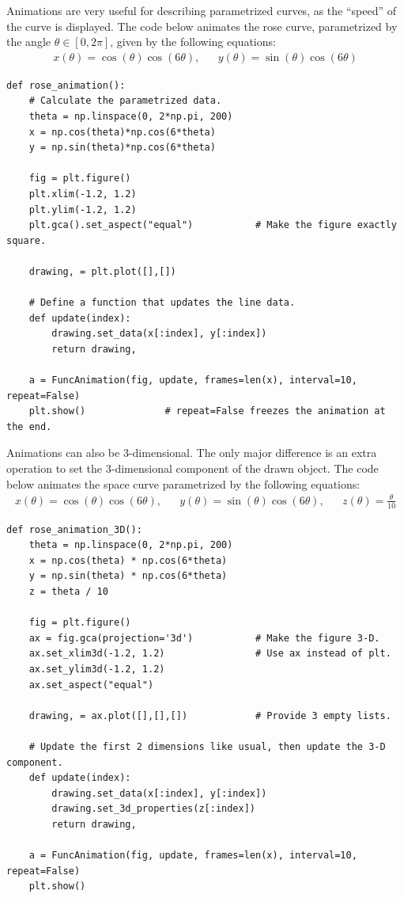 Animations are very useful for describing parametrized curves, as the ``speed'' of the curve is displayed.
The code below animates the rose curve, parametrized by the angle $\theta \in [0, 2\pi]$, given by the following equations:
%
\[\begin{array}{ccc}
x(\theta) = \cos(\theta)\cos(6\theta), && y(\theta) = \sin(\theta)\cos(6\theta)
\end{array}\]

\begin{lstlisting}
def rose_animation():
    # Calculate the parametrized data.
    theta = np.linspace(0, 2*np.pi, 200)
    x = np.cos(theta)*np.cos(6*theta)
    y = np.sin(theta)*np.cos(6*theta)

    fig = plt.figure()
    plt.xlim(-1.2, 1.2)
    plt.ylim(-1.2, 1.2)
    plt.gca().set_aspect("equal")           # Make the figure exactly square.

    drawing, = plt.plot([],[])

    # Define a function that updates the line data.
    def update(index):
        drawing.set_data(x[:index], y[:index])
        return drawing,

    a = FuncAnimation(fig, update, frames=len(x), interval=10, repeat=False)
    plt.show()              # repeat=False freezes the animation at the end.
\end{lstlisting}

Animations can also be 3-dimensional.
The only major difference is an extra operation to set the 3-dimensional component of the drawn object.
The code below animates the space curve parametrized by the following equations:
%
\[\begin{array}{ccccc}
x(\theta) = \cos(\theta)\cos(6\theta), &&
y(\theta) = \sin(\theta)\cos(6\theta), &&
z(\theta) = \frac{\theta}{10}
\end{array}\]

\begin{lstlisting}
def rose_animation_3D():
    theta = np.linspace(0, 2*np.pi, 200)
    x = np.cos(theta) * np.cos(6*theta)
    y = np.sin(theta) * np.cos(6*theta)
    z = theta / 10

    fig = plt.figure()
    ax = fig.gca(projection='3d')           # Make the figure 3-D.
    ax.set_xlim3d(-1.2, 1.2)                # Use ax instead of plt.
    ax.set_ylim3d(-1.2, 1.2)
    ax.set_aspect("equal")

    drawing, = ax.plot([],[],[])            # Provide 3 empty lists.

    # Update the first 2 dimensions like usual, then update the 3-D component.
    def update(index):
        drawing.set_data(x[:index], y[:index])
        drawing.set_3d_properties(z[:index])
        return drawing,

    a = FuncAnimation(fig, update, frames=len(x), interval=10, repeat=False)
    plt.show()
\end{lstlisting}

